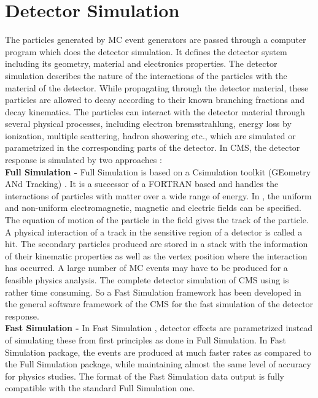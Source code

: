\section{Detector Simulation}
The particles generated by MC event generators are passed through a computer program which does the detector simulation. It defines the detector system including its geometry, material and electronics properties. The detector simulation describes the nature of the interactions of the particles with the material of the detector. While propagating through the detector material, these particles are allowed to decay according to their known branching fractions and decay kinematics. The particles can interact with the detector material through several physical processes, including electron bremsstrahlung, energy loss by ionization, multiple scattering, hadron showering etc., which are simulated or parametrized in the corresponding parts of the detector. In CMS, the detector response is simulated by two approaches \cite{Bayatian:2006nff} : \\ \newline
{\bf Full Simulation -} Full Simulation is based on a C\plusn\plus simulation toolkit \GEANTfour (GEometry ANd Tracking) \cite{Agostinelli:2002hh}. It is a successor of a FORTRAN based \GEANTthree and handles the interactions of particles with matter over a wide range of energy. In \GEANTfour, the uniform and non-uniform electromagnetic, magnetic and electric fields can be specified. The equation of motion of the particle in the field gives the track of the particle. A physical interaction of a track in the sensitive region of a detector is called a hit. The secondary particles produced are stored in a stack with the information of their kinematic properties as well as the vertex position where the interaction has occurred. A large number of MC events may have to be produced for a feasible physics analysis. The complete detector simulation of CMS using \GEANTfour is rather time consuming. So a Fast Simulation framework has been developed in the general software framework of the CMS for the fast simulation of the detector response.\\ \newline 
{\bf Fast Simulation -} In Fast Simulation \cite{Abdullin:2011zz}, detector effects are parametrized instead of simulating these from first principles as done in Full Simulation. In Fast Simulation package, the events are produced at much faster rates as compared to the Full Simulation package, while maintaining almost the same level of accuracy for physics studies. The format of the Fast Simulation data output is fully compatible with the standard Full Simulation one. 

